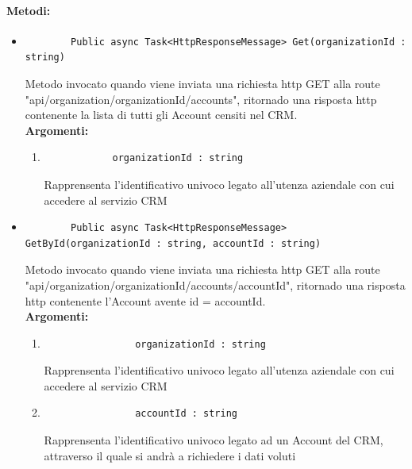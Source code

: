 \paragraph{Metodi:}\hfill
\begin{itemize}
	\itemsep0em 
	\item 
		\begin{lstlisting}
		Public async Task<HttpResponseMessage> Get(organizationId : string)
		\end{lstlisting}
		Metodo invocato quando viene inviata una richiesta http GET alla route "api/organization/{organizationId}/accounts", ritornado una risposta http contenente la lista di tutti gli Account censiti nel CRM.\\
		\textbf{\small Argomenti:}
		\begin{enumerate}[leftmargin=*]
			\itemsep0em 
			\item \begin{lstlisting}
			organizationId : string 
			\end{lstlisting}
			Rapprensenta l'identificativo univoco legato all'utenza aziendale con cui accedere al servizio CRM
		\end{enumerate}
		
	\item 
		\begin{lstlisting}
		Public async Task<HttpResponseMessage> GetById(organizationId : string, accountId : string)
		\end{lstlisting}
		Metodo invocato quando viene inviata una richiesta http GET alla route "api/organization/{organizationId}/accounts/{accountId}", ritornado una risposta http contenente l'Account avente id = {accountId}.\\
		\textbf{\small Argomenti:}
		\begin{enumerate}[leftmargin=*]
			\itemsep0em 
			\item 
				\begin{lstlisting}
				organizationId : string 
				\end{lstlisting}
				Rapprensenta l'identificativo univoco legato all'utenza aziendale con cui accedere al servizio CRM
			\item 
				\begin{lstlisting}
				accountId : string
				\end{lstlisting}
				Rapprensenta l'identificativo univoco legato ad un Account del CRM, attraverso il quale si andrà a richiedere i dati voluti
		\end{enumerate}
\end{itemize}
\vfill



